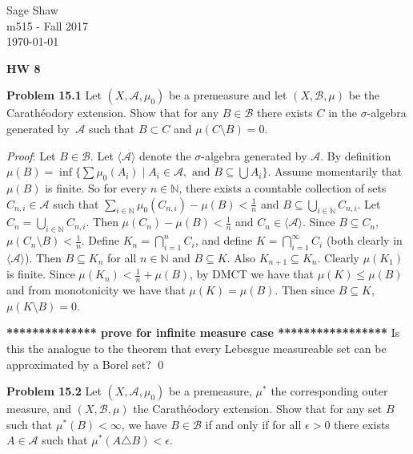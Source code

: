 \documentclass[12pt]{article}
\newcommand{\problem}[1]{\hspace{-4 ex} \large \textbf{Problem #1} }
\renewenvironment{proof}{\hspace{-4 ex} \emph{Proof}:}{\qed}
\newcommand{\NN}{\mathbb{N}}
\newcommand{\BB}{\mathcal{B}}
\newcommand{\SA}{\mathcal{A}}
\begin{document}
	\thispagestyle{empty}
	
	\begin{flushright}
		Sage Shaw \\
		m515 - Fall 2017 \\
		\today
	\end{flushright}
	
{\large \textbf{HW 8}}\bigbreak

\problem{15.1} 
Let $(X, \SA,\mu_0)$ be a premeasure and let $(X,\mathcal B,\mu)$ be the Carath\'eodory extension. Show that for any $B \in \BB$ there exists $C$ in the $\sigma$-algebra generated by $\ \SA$ such that $B\subset C$ and $\mu(C\setminus B)=0$.
\bigbreak

\begin{proof}
	Let $B \in \BB$. Let $\langle \SA \rangle$ denote the $\sigma$-algebra generated by $\SA$. By definition $\mu(B) = \inf \{ \sum \mu_0(A_i) \mid A_i \in \mathcal{A}, \text{ and } B \subseteq \bigcup A_i \}$. Assume momentarily that $\mu(B)$ is finite. So for every $n \in \NN$, there exists a countable collection of sets $C_{n,i} \in \mathcal{A}$ such that $\sum\limits_{i \in \NN} \mu_0(C_{n,i}) - \mu(B) < \tfrac{1}{n}$ and $B \subseteq \bigcup\limits_{i \in \NN} C_{n,i}$. Let $C_n = \bigcup\limits_{i \in \NN} C_{n,i}$. Then $\mu(C_n) - \mu(B) < \tfrac{1}{n}$ and $C_n \in \langle \SA \rangle$. Since $B \subseteq C_n$, $\mu(C_n \setminus B) < \tfrac{1}{n}$. Define $K_n = \bigcap_{i=1}^n C_i$, and define $K = \bigcap_{i=1}^\infty C_i$ (both clearly in $\langle \SA \rangle$). Then $B \subseteq K_n$ for all $n \in \NN$ and $B \subseteq K$. Also $K_{n+1} \subseteq K_n$. Clearly $\mu(K_1)$ is finite. Since $\mu(K_n) < \tfrac{1}{n} + \mu(B)$, by DMCT we have that $\mu(K) \leq \mu(B)$ and from monotonicity we have that $\mu(K) = \mu(B)$. Then since $B \subseteq K$, $\mu(K \setminus B) = 0$. \bigbreak
	
	\textbf{************** prove for infinite measure case *****************}
	Is this the analogue to the theorem that every Lebesgue measureable set can be approximated by a Borel set?
\end{proof}



\bigbreak
\problem{15.2} Let $(X,\mathcal A,\mu_0)$ be a premeasure, $\mu^*$ the corresponding outer measure, and $(X,\mathcal B,\mu)$ the Carath\'eodory extension. Show that for any set $B$ such that $\mu^*(B)<\infty$, we have $B\in\mathcal B$ if and only if for all $\epsilon>0$ there exists $A\in\mathcal A$ such that $\mu^*(A\triangle B)<\epsilon$.
\bigbreak
\end{document}
